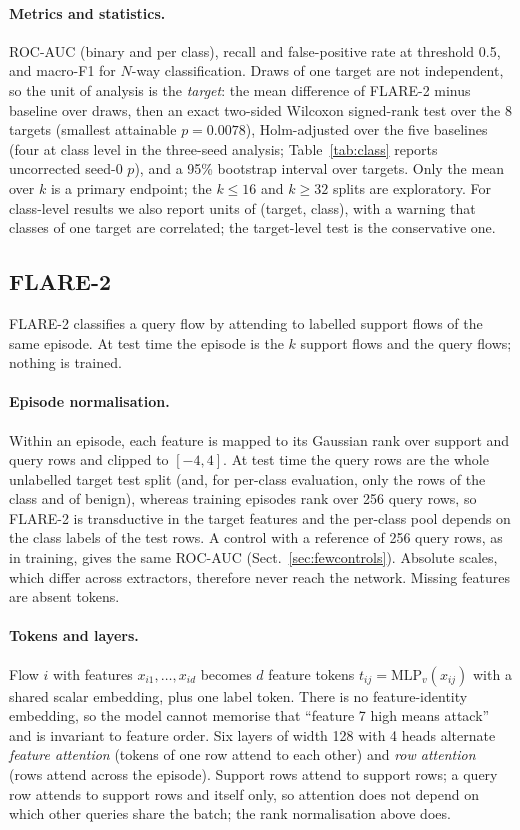\documentclass[pdflatex,sn-mathphys-num]{sn-jnl}%
\begin{document}
\paragraph{Metrics and statistics.}
ROC-AUC (binary and per class), recall and false-positive rate at threshold 0.5, and macro-F1 for $N$-way classification.
Draws of one target are not independent, so the unit of analysis is the \emph{target}: the mean difference of FLARE-2 minus baseline over draws, then an exact two-sided Wilcoxon signed-rank test over the 8 targets (smallest attainable $p=0.0078$), Holm-adjusted over the five baselines (four at class level in the three-seed analysis; Table~\ref{tab:class} reports uncorrected seed-0 $p$), and a 95\% bootstrap interval over targets. Only the mean over $k$ is a primary endpoint; the $k\le16$ and $k\ge32$ splits are exploratory.
For class-level results we also report units of (target, class), with a warning that classes of one target are correlated; the target-level test is the conservative one.

\subsection{FLARE-2}\label{sec:method}
FLARE-2 classifies a query flow by attending to labelled support flows of the same episode.
At test time the episode is the $k$ support flows and the query flows; nothing is trained.

\paragraph{Episode normalisation.}
Within an episode, each feature is mapped to its Gaussian rank over support and query rows and clipped to $[-4,4]$. At test time the query rows are the whole unlabelled target test split (and, for per-class evaluation, only the rows of the class and of benign), whereas training episodes rank over 256 query rows, so FLARE-2 is transductive in the target features and the per-class pool depends on the class labels of the test rows. A control with a reference of 256 query rows, as in training, gives the same ROC-AUC (Sect.~\ref{sec:fewcontrols}).
Absolute scales, which differ across extractors, therefore never reach the network.
Missing features are absent tokens.

\paragraph{Tokens and layers.}
Flow $i$ with features $x_{i1},\dots,x_{id}$ becomes $d$ feature tokens $t_{ij}=\mathrm{MLP}_v(x_{ij})$ with a shared scalar embedding, plus one label token.
There is no feature-identity embedding, so the model cannot memorise that ``feature 7 high means attack'' and is invariant to feature order.
Six layers of width 128 with 4 heads alternate \emph{feature attention} (tokens of one row attend to each other) and \emph{row attention} (rows attend across the episode).
Support rows attend to support rows; a query row attends to support rows and itself only, so attention does not depend on which other queries share the batch; the rank normalisation above does.
\end{document}
